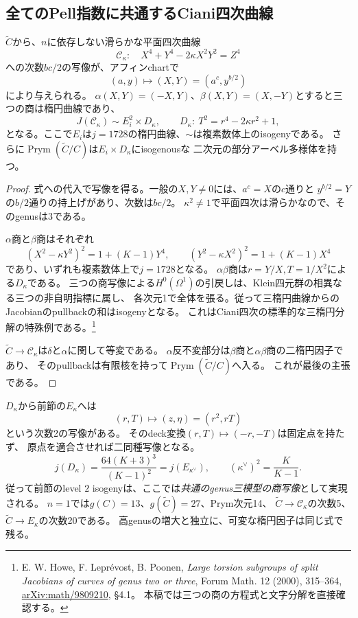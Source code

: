 \subsection{全てのPell指数に共通するCiani四次曲線}
\begin{theorem}[genus三の中間模型と三楕円分解]
\label{thm:universal-ciani-milnor}
$\widetilde C$から、$n$に依存しない滑らかな平面四次曲線
\[
 \mathcal C_\kappa:\quad X^4+Y^4-2\kappa X^2Y^2=Z^4
\]
への次数$bc/2$の写像が、アフィンchartで
\[
 (a,y)\longmapsto(X,Y)=(a^c,y^{b/2})
\]
により与えられる。
$\alpha(X,Y)=(-X,Y)$、$\beta(X,Y)=(X,-Y)$とすると三つの商は楕円曲線であり、
\[
 J(\mathcal C_\kappa)\sim E_i^2\times D_\kappa,\qquad
 D_\kappa:\ T^2=r^4-2\kappa r^2+1,
\]
となる。ここで$E_i$は$j=1728$の楕円曲線、$\sim$は複素数体上のisogenyである。
さらに$\operatorname{Prym}(\widetilde C/C)$は$E_i\times D_\kappa$にisogenousな
二次元の部分アーベル多様体を持つ。
\end{theorem}
\begin{proof}
式への代入で写像を得る。一般の$X,Y\ne0$には、$a^c=X$の$c$通りと
$y^{b/2}=Y$の$b/2$通りの持上げがあり、次数は$bc/2$。
$\kappa^2\ne1$で平面四次は滑らかなので、そのgenusは3である。

$\alpha$商と$\beta$商はそれぞれ
\[
 (X^2-\kappa Y^2)^2=1+(K-1)Y^4,\qquad
 (Y^2-\kappa X^2)^2=1+(K-1)X^4
\]
であり、いずれも複素数体上で$j=1728$となる。
$\alpha\beta$商は$r=Y/X,T=1/X^2$による$D_\kappa$である。
三つの商写像による$H^0(\Omega^1)$の引戻しは、Klein四元群の相異なる三つの非自明指標に属し、
各次元1で全体を張る。従って三楕円曲線からのJacobianのpullbackの和はisogenyとなる。
これはCiani四次の標準的な三楕円分解の特殊例である。\footnote{
E. W. Howe, F. Lepr\'evost, B. Poonen,
\emph{Large torsion subgroups of split Jacobians of curves of genus two or three},
Forum Math. 12 (2000), 315--364,
\href{https://arxiv.org/abs/math/9809210}{arXiv:math/9809210}, \S4.1。
本稿では三つの商の方程式と文字分解を直接確認する。
}

$\widetilde C\to\mathcal C_\kappa$は$\delta$と$\alpha$に関して等変である。
$\alpha$反不変部分は$\beta$商と$\alpha\beta$商の二楕円因子であり、
そのpullbackは有限核を持って$\operatorname{Prym}(\widetilde C/C)$へ入る。
これが最後の主張である。
\end{proof}

$D_\kappa$から前節の$E_\kappa$へは
\begin{equation}\label{eq:ciani-level2-isogeny}
 (r,T)\longmapsto(z,\eta)=(r^2,rT)
\end{equation}
という次数2の写像がある。
そのdeck変換$(r,T)\mapsto(-r,-T)$は固定点を持たず、
原点を適合させれば二同種写像となる。
\[
 j(D_\kappa)=\frac{64(K+3)^3}{(K-1)^2}
 =j\left(E_{\kappa^\vee}\right),\qquad
 (\kappa^\vee)^2=\frac K{K-1}.
\]
従って前節のlevel $2$ isogenyは、ここでは\emph{共通のgenus三模型の商写像}として実現される。
$n=1$では$g(C)=13$、$g(\widetilde C)=27$、Prym次元14、
$\widetilde C\to\mathcal C_\kappa$の次数5、$\widetilde C\to E_\kappa$の次数20である。
高genusの増大と独立に、可変な楕円因子は同じ式で残る。

